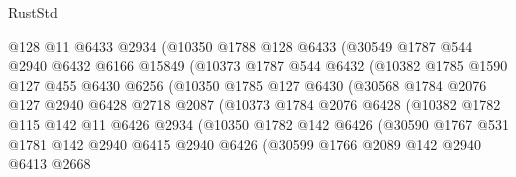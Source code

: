 \begin{lexlean}{RustStd}
\begin{coremodule}
                    @128
                    @11
                    @6433
                    @2934
                    (@10350
                      @1788
                      @128
                      @6433
                      (@30549
                        @1787
                        @544
                        @2940
                        @6432
                        @6166
                        @15849
                        (@10373
                          @1787
                          @544
                          @6432
                          (@10382
                            @1785
                            @1590
                            @127
                            @455
                            @6430
                            @6256
                            (@10350
                              @1785
                              @127
                              @6430
                              (@30568
                                @1784
                                @2076
                                @127
                                @2940
                                @6428
                                @2718
                                @2087
                                (@10373
                                  @1784
                                  @2076
                                  @6428
                                  (@10382
                                    @1782
                                    @115
                                    @142
                                    @11
                                    @6426
                                    @2934
                                    (@10350
                                      @1782
                                      @142
                                      @6426
                                      (@30590
                                        @1767
                                        @531
                                        @1781
                                        @142
                                        @2940
                                        @6415
                                        @2940
                                        @6426
                                        (@30599
                                          @1766
                                          @2089
                                          @142
                                          @2940
                                          @6413
                                          @2668

\end{coremodule}
\end{lexlean}
